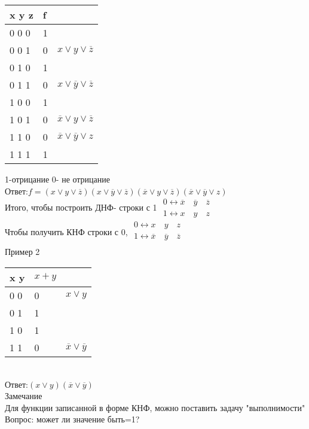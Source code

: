 \documentclass{article}
\begin{document}
\begin{tabular}{l|ll}
 x y z&f&\\
\hline
0 0 0&  1 &  \\
0 0 1&  0 & $x\vee y\vee\overline{z}$  \\
0 1 0&  1 &  \\
0 1 1&  0 & $x\vee\overline{y}\vee\overline{z}$ \\
1 0 0&  1 &  \\
1 0 1&  0 & $\overline{x}\vee y\vee \overline{z}$\\
1 1 0&  0 & $\overline{x}\vee\overline{y}\vee z$ \\
1 1 1&  1 &  \\
\end{tabular} 1-отрицание 0- не отрицание\\
Ответ:$f=(x\vee y\vee\overline{z})(x\vee\overline{y}\vee\overline{z})(\overline{x}\vee y\vee \overline{z})(\overline{x}\vee\overline{y}\vee z)$\\
Итого, чтобы построить ДНФ- строки с 1 $
\left.
\begin{array}{lcl}
0\leftrightarrow \overline{x}\quad \overline{y} \quad\overline{z}\\
1\leftrightarrow x \quad y\quad  z
\end{array}
\right.
$\\
Чтобы получить КНФ строки с 0, $
\left.
\begin{array}{lcl}
0\leftrightarrow x \quad y\quad  z\\
1\leftrightarrow \overline{x}\quad \overline{y} \quad\overline{z}\\
\end{array}
\right.
$\\
Пример 2\\
\begin{tabular}{l|ll}
 x y&$x + y$&\\
\hline
0 0 &  0 & $x\vee y$ \\
0 1 &  1 &   \\
1 0 &  1 &  \\
1 1 &  0 & $\overline{x}\vee\overline{y}$ \\
\end{tabular}\\
Ответ:$(x\vee y)(\overline{x}\vee \overline{y})$\\
Замечание\\
Для функции записанной в форме КНФ, можно поставить задачу "выполнимости"\\
Вопрос: может ли значение быть=1?\\
\end{document}
